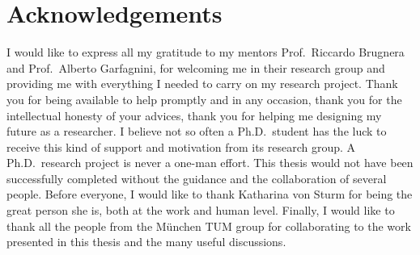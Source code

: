 
\chapter*{Acknowledgements}

I would like to express all my gratitude to my mentors Prof.~Riccardo Brugnera and
Prof.~Alberto Garfagnini, for welcoming me in their research group and providing me with
everything I needed to carry on my research project. Thank you for being available to help
promptly and in any occasion, thank you for the intellectual honesty of your advices,
thank you for helping me designing my future as a researcher. I believe not so often a
Ph.D.~student has the luck to receive this kind of support and motivation from its
research group.
\newpar
A Ph.D.~research project is never a one-man effort. This thesis would not have been
successfully completed without the guidance and the collaboration of several people. Before
everyone, I would like to thank Katharina von Sturm for being the great person she is,
both at the work and human level. Finally, I would like to thank all the people from the
M\"unchen TUM group for collaborating to the work presented in this thesis and the many
useful discussions.

